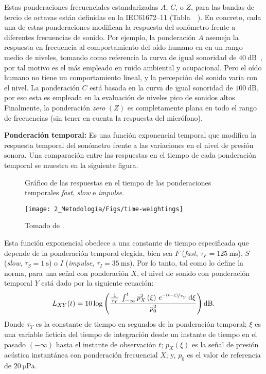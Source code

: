 Estas ponderaciones frecuenciales estandarizadas $A$, $C$, o $Z$, para las bandas de tercio de octavas están definidas en la \mbox{IEC61672--11} (\mbox{Tabla }~\citeyear{IEC_TC29_2013_1}).
En concreto, cada una de estas ponderaciones modifican la respuesta del sonómetro frente a diferentes frecuencias de sonido.
Por ejemplo, la ponderación $A$ asemeja la respuesta en frecuencia al comportamiento del oído humano en en un rango medio de niveles, tomando como referencia la curva de igual sonoridad de $\qty{40}{\dB}$~\citep{Fletcher1933}, por tal motivo es el más empleado en ruido ambiental y ocupacional.
Pero el oído humano no tiene un comportamiento lineal, y la percepción del sonido varía con el nivel.
La ponderación $C$ está basada en la curva de igual sonoridad de $\qty{100}{\dB}$, por eso esta es empleada en la evaluación de niveles pico de sonidos altos.
Finalmente, la ponderación \emph{zero} $(Z)$ es completamente plana en todo el rango de frecuencias (sin tener en cuenta la respuesta del micrófono).

\textbf{Ponderación temporal:} Es una función exponencial temporal que modifica la respuesta temporal del sonómetro frente a las variaciones en el nivel de presión sonora.
Una comparación entre las respuestas en el tiempo de cada ponderación temporal se muestra en la siguiente figura.
%
\begin{figure}[!h]
    \caption{Gráfico de las respuestas en el tiempo de las ponderaciones temporales \emph{fast}, \emph{slow} e \emph{impulse}.}
    \label{fig:time_weightings}
    \centering
    \texttt{[image: 2\_Metodología/Figs/time-weightings]}
    \caption*{\footnotesize Tomado de .}
\end{figure}

Esta función exponencial obedece a una constante de tiempo especificada que depende de la ponderación temporal elegida, bien sea $F$ (\emph{fast}, $\tau_F = \qty{125}{\ms}$), $S$ (\emph{slow}, $\tau_S = \qty{1}{\s}$) o $I$ (\emph{impulse}, $\tau_I = \qty{35}{\ms}$).
Por lo tanto, tal como lo define la norma, para una señal con ponderación $X$, el nivel de sonido con ponderación temporal $Y$ está dado por la siguiente ecuación:
%
\begin{equation}
    \label{eq:time_weighted_level}
    L_{XY}(t) = 10 \log\left(\frac{\frac{1}{\tau_Y}\,
    \int_{-\infty}^t p_X^2\left(\xi\right)\,e^{\nicefrac{-\left(t - \xi\right)}{\tau_Y}}\,\mathrm{d}\xi}
    {p_0^2}\right) \unit{\dB}.
\end{equation}
%
Donde $\tau_Y$ es la constante de tiempo en segundos de la ponderación temporal; $\xi$ es una variable ficticia del tiempo de integración desde un instante de tiempo en el pasado $(-\infty)$ hasta el instante de observación $t$; $p_X\left(\xi\right)$ es la señal de presión acústica instantánea con ponderación frecuencial $X$; y, $p_0$ es el valor de referencia de $\qty{20}{\micro\Pa}$.

